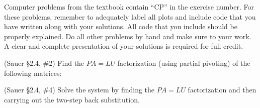 \documentclass[12pt,fleqn]{exam}
\begin{document}
Computer problems from the textbook contain ``CP'' in the exercise number. For these problems, remember to adequately label all plots and include code that you have written along with your solutions. All code that you include should be properly explained. Do all other problems by hand and make sure to your work. A clear and complete presentation of your solutions is required for full credit.

\begin{questions}

\question (Sauer \S2.4, \#2) Find the $PA = LU$ factorization (using partial pivoting) of the following matrices:


\question (Sauer \S2.4, \#4) Solve the system by finding the $PA = LU$ factorization and then carrying out the two-step back substitution.


\end{questions}
\end{document}
